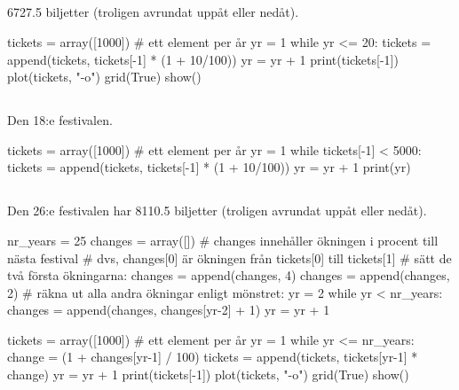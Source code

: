 \subsection*{}
6727.5 biljetter (troligen avrundat uppåt eller nedåt).
\vspace{10pt}
\begin{python}
tickets = array([1000]) # ett element per år
yr = 1
while yr <= 20:
	tickets = append(tickets, tickets[-1] * (1 + 10/100))
	yr = yr + 1
print(tickets[-1])
plot(tickets, "-o")
grid(True)
show()
\end{python}
\newpage
\subsection*{}
Den 18:e festivalen.
\vspace{10pt}
\begin{python}
tickets = array([1000]) # ett element per år
yr = 1
while tickets[-1] < 5000:
	tickets = append(tickets, tickets[-1] * (1 + 10/100))
	yr = yr + 1
print(yr)
\end{python}

\subsection*{}
Den 26:e festivalen har 8110.5 biljetter (troligen avrundat uppåt eller nedåt).
\vspace{10pt}
\begin{python}
nr_years = 25
changes = array([])
# changes innehåller ökningen i procent till nästa festival
# dvs, changes[0] är ökningen från tickets[0] till tickets[1]
# sätt de två första ökningarna:
changes = append(changes, 4)
changes = append(changes, 2)
# räkna ut alla andra ökningar enligt mönstret:
yr = 2
while yr < nr_years:
	changes = append(changes, changes[yr-2] + 1)
	yr = yr + 1

tickets = array([1000]) # ett element per år
yr = 1
while yr <= nr_years:
	change = (1 + changes[yr-1] / 100)
	tickets = append(tickets, tickets[yr-1] * change)
	yr = yr + 1
print(tickets[-1])
plot(tickets, "-o")
grid(True)
show()
\end{python}



